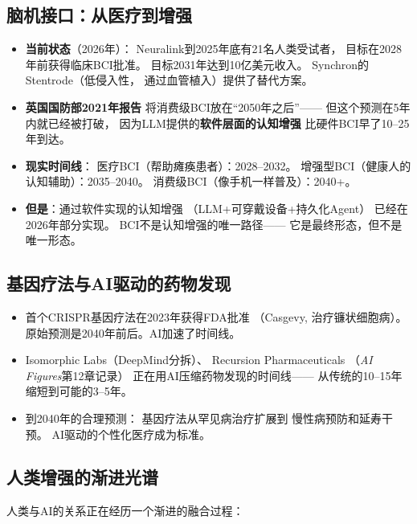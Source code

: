 \subsection{脑机接口：从医疗到增强}

\begin{itemize}
  \item \textbf{当前状态}（2026年）：
    Neuralink到2025年底有21名人类受试者，
    目标在2028年前获得临床BCI批准。
    目标2031年达到10亿美元收入。
    Synchron的Stentrode（低侵入性，
    通过血管植入）提供了替代方案。
  \item \textbf{英国国防部2021年报告}
    将消费级BCI放在``2050年之后''——
    但这个预测在5年内就已经被打破，
    因为LLM提供的\textbf{软件层面的认知增强}
    比硬件BCI早了10--25年到达。
  \item \textbf{现实时间线}：
    医疗BCI（帮助瘫痪患者）：2028--2032。
    增强型BCI（健康人的认知辅助）：2035--2040。
    消费级BCI（像手机一样普及）：2040+。
  \item \textbf{但是}：通过软件实现的认知增强
    （LLM+可穿戴设备+持久化Agent）
    已经在2026年部分实现。
    BCI不是认知增强的唯一路径——
    它是最终形态，但不是唯一形态。
\end{itemize}

\subsection{基因疗法与AI驱动的药物发现}

\begin{itemize}
  \item 首个CRISPR基因疗法在2023年获得FDA批准
    （Casgevy, 治疗镰状细胞病）。
    原始预测是2040年前后。AI加速了时间线。
  \item Isomorphic Labs（DeepMind分拆）、
    Recursion Pharmaceuticals
    （\textit{AI Figures}第12章记录）
    正在用AI压缩药物发现的时间线——
    从传统的10--15年缩短到可能的3--5年。
  \item 到2040年的合理预测：
    基因疗法从罕见病治疗扩展到
    慢性病预防和延寿干预。
    AI驱动的个性化医疗成为标准。
\end{itemize}

\subsection{人类增强的渐进光谱}

人类与AI的关系正在经历一个渐进的融合过程：

